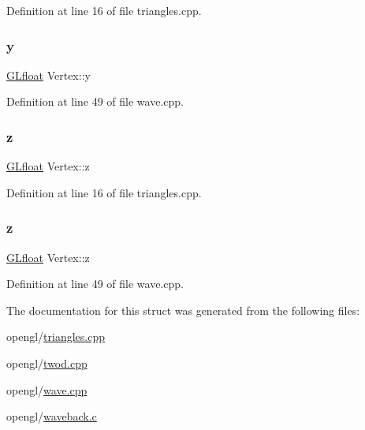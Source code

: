Definition at line 16 of file triangles.\+cpp.

\mbox{\label{struct_vertex_a53f2719389e21b4e931282336d3817aa}} 
\subsubsection{\texorpdfstring{y}{y}\hspace{0.1cm}{\footnotesize\ttfamily [2/2]}}
{\footnotesize\ttfamily \mbox{\hyperlink{glad_8h_a836cf6377099e88abf24c255b5b0ac52}{G\+Lfloat}} Vertex\+::y}



Definition at line 49 of file wave.\+cpp.

\mbox{\label{struct_vertex_acda9f16691b233ed0d8db0f12079f7e9}} 
\subsubsection{\texorpdfstring{z}{z}\hspace{0.1cm}{\footnotesize\ttfamily [1/2]}}
{\footnotesize\ttfamily \mbox{\hyperlink{glad_8h_a836cf6377099e88abf24c255b5b0ac52}{G\+Lfloat}} Vertex\+::z}



Definition at line 16 of file triangles.\+cpp.

\mbox{\label{struct_vertex_acda9f16691b233ed0d8db0f12079f7e9}} 
\subsubsection{\texorpdfstring{z}{z}\hspace{0.1cm}{\footnotesize\ttfamily [2/2]}}
{\footnotesize\ttfamily \mbox{\hyperlink{glad_8h_a836cf6377099e88abf24c255b5b0ac52}{G\+Lfloat}} Vertex\+::z}



Definition at line 49 of file wave.\+cpp.



The documentation for this struct was generated from the following files\+:\begin{DoxyCompactItemize}
\item 
opengl/\mbox{\hyperlink{opengl_2triangles_8cpp}{triangles.\+cpp}}\item 
opengl/\mbox{\hyperlink{opengl_2twod_8cpp}{twod.\+cpp}}\item 
opengl/\mbox{\hyperlink{opengl_2wave_8cpp}{wave.\+cpp}}\item 
opengl/\mbox{\hyperlink{opengl_2waveback_8c}{waveback.\+c}}\end{DoxyCompactItemize}
